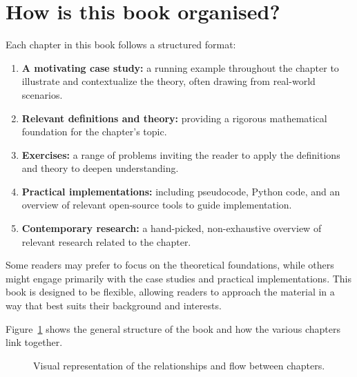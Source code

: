 \section{How is this book organised?}

Each chapter in this book follows a structured format:

\begin{enumerate}
    \item  \textbf{A motivating case study:} a running example throughout the chapter to 
        illustrate and contextualize the theory, often drawing from real-world scenarios.
    \item  \textbf{Relevant definitions and theory:} providing a rigorous mathematical 
        foundation for the chapter’s topic.
    \item  \textbf{Exercises:} a range of problems inviting the reader to apply the definitions 
        and theory to deepen understanding.
    \item  \textbf{Practical implementations:} including pseudocode, Python code, and an 
        overview of relevant open-source tools to guide implementation.
    \item  \textbf{Contemporary research:} a hand-picked, non-exhaustive overview of 
        relevant research related to the chapter.
\end{enumerate}

Some readers may prefer to focus on the theoretical foundations, while others
might engage primarily with the case studies and practical implementations. This
book is designed to be flexible, allowing readers to approach the material in a
way that best suits their background and interests.

Figure~\ref{fig:structure} shows the general structure of the book and how the
various chapters link together.

\begin{figure}[!htbp]
    \newcommand{\imagenode}[3]{ %
            \node (#1) at #2 [label=above:\raisebox{-3em}{{\parbox{4em}{\centering \tiny #3}}}] {\texttt{[image: chapters/\#1/logo/main.pdf]}};
    }
    \begin{center}
    \end{center}
    \caption{Visual representation of the relationships and flow between chapters.}
    \label{fig:structure}
\end{figure}
